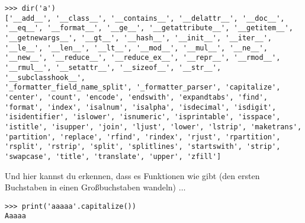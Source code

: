 \begin{Verbatim}[frame=single]
>>> dir('a')
['__add__', '__class__', '__contains__', '__delattr__', '__doc__',
'__eq__', '__format__', '__ge__', '__getattribute__', '__getitem__',
'__getnewargs__', '__gt__', '__hash__', '__init__', '__iter__',
'__le__', '__len__', '__lt__', '__mod__', '__mul__', '__ne__',
'__new__', '__reduce__', '__reduce_ex__', '__repr__', '__rmod__',
'__rmul__', '__setattr__', '__sizeof__', '__str__', '__subclasshook__',
'_formatter_field_name_split', '_formatter_parser', 'capitalize',
'center', 'count', 'encode', 'endswith', 'expandtabs', 'find',
'format', 'index', 'isalnum', 'isalpha', 'isdecimal', 'isdigit',
'isidentifier', 'islower', 'isnumeric', 'isprintable', 'isspace',
'istitle', 'isupper', 'join', 'ljust', 'lower', 'lstrip', 'maketrans',
'partition', 'replace', 'rfind', 'rindex', 'rjust', 'rpartition',
'rsplit', 'rstrip', 'split', 'splitlines', 'startswith', 'strip',
'swapcase', 'title', 'translate', 'upper', 'zfill']
\end{Verbatim}

Und hier kannst du erkennen, dass es Funktionen wie  gibt (den ersten Buchstaben in einen Großbuchstaben wandeln) \texorpdfstring{$\ldots$}{...}

\begin{Verbatim}[frame=single]
>>> print('aaaaa'.capitalize())
Aaaaa
\end{Verbatim}


